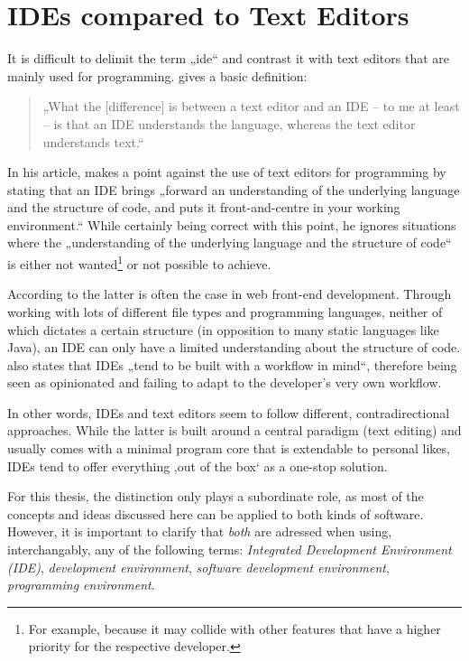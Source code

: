 \section{IDEs compared to Text
Editors}\label{ides-compared-to-text-editors}

It is difficult to delimit the term „\acl{ide}“ and contrast it with
text editors that are mainly used for programming. 
gives a basic definition:

\begin{quote}
„What the {[}difference{]} is between a text editor and an IDE – to me
at least – is that an IDE understands the language, whereas the text
editor understands text.“ \citeyear{reynolds}
\end{quote}

In his article,  makes a point against the use of
text editors for programming by stating that an IDE brings „forward an
understanding of the underlying language and the structure of code, and
puts it front-and-centre in your working environment.“
\citeyear{reynolds} While certainly being correct with this point, he
ignores situations where the „understanding of the underlying language
and the structure of code“ is either not
wanted\footnote{For example, because it may collide with other features that have a higher priority for the respective developer.}
or not possible to achieve.

According to  the latter is often the case in web
front-end development. Through working with lots of different file types
and programming languages, neither of which dictates a certain structure
(in opposition to many static languages like Java), an IDE can only have
a limited understanding about the structure of code. 
also states that IDEs „tend to be built with a workflow in mind“,
therefore being seen as opinionated and failing to adapt to the
developer’s very own workflow.

In other words, IDEs and text editors seem to follow different,
contradirectional approaches. While the latter is built around a central
paradigm (text editing) and usually comes with a minimal program core
that is extendable to personal likes, IDEs tend to offer everything ‚out
of the box‘ as a one-stop solution.

For this thesis, the distinction only plays a subordinate role, as most
of the concepts and ideas discussed here can be applied to both kinds of
software. However, it is important to clarify that \emph{both} are
adressed when using, interchangably, any of the following terms:
\emph{Integrated Development Environment (IDE)}, \emph{development
environment}, \emph{software development environment}, \emph{programming
environment}.


